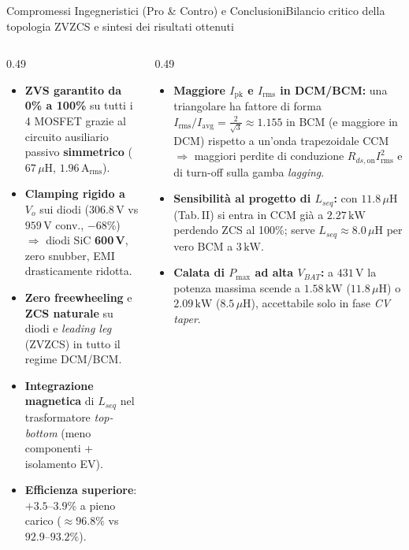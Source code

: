 \documentclass[aspectratio=169,9pt]{beamer}
\newcommand{\V}{\,\text{V}}
\newcommand{\A}{\,\text{A}}
\newcommand{\kW}{\,\text{kW}}
\newcommand{\uH}{\,\mu\text{H}}
\begin{document}
\begin{frame}{Compromessi Ingegneristici (Pro \& Contro) e Conclusioni}{Bilancio critico della topologia ZVZCS e sintesi dei risultati ottenuti}
  \begin{columns}[T,onlytextwidth]
    \begin{column}{0.49\textwidth}
      \begin{okbox}[title={Punti di Forza Dimostrati}]
        \begin{itemize}\setlength{\itemsep}{1.8pt}
          \item \textbf{ZVS garantito da 0\% a 100\%} su tutti i 4 MOSFET grazie al circuito ausiliario passivo \textbf{simmetrico} ($67\uH$, $1.96\A_{\text{rms}}$).
          \item \textbf{Clamping rigido a $V_o$} sui diodi ($306.8\V$ vs $959\V$ conv., $-68\%$) $\Rightarrow$ diodi SiC \textbf{600\,V}, zero snubber, EMI drasticamente ridotta.
          \item \textbf{Zero freewheeling} e \textbf{ZCS naturale} su diodi e \emph{leading leg} (ZVZCS) in tutto il regime DCM/BCM.
          \item \textbf{Integrazione magnetica} di $L_{seq}$ nel trasformatore \emph{top-bottom} (meno componenti + isolamento EV).
          \item \textbf{Efficienza superiore}: $\mathbf{+3.5\text{--}3.9\%}$ a pieno carico ($\approx 96.8\%$ vs $92.9\text{--}93.2\%$).
        \end{itemize}
      \end{okbox}
    \end{column}
    \begin{column}{0.49\textwidth}
      \begin{warnbox}[title={Compromessi e Limiti Progettuali}]
        \begin{itemize}\setlength{\itemsep}{1.8pt}
          \item \textbf{Maggiore $I_{\text{pk}}$ e $I_{\text{rms}}$ in DCM/BCM:} una triangolare ha fattore di forma $I_{\text{rms}}/I_{\text{avg}}=\frac{2}{\sqrt{3}}\approx 1.155$ in BCM (e maggiore in DCM) rispetto a un'onda trapezoidale CCM $\Rightarrow$ maggiori perdite di conduzione $R_{ds,\text{on}}I_{\text{rms}}^2$ e di turn-off sulla gamba \emph{lagging}.
          \item \textbf{Sensibilit\`a al progetto di $L_{seq}$:} con $11.8\uH$ (Tab.\,II) si entra in CCM gi\`a a $2.27\kW$ perdendo ZCS al 100\%; serve \textbf{$L_{seq}\approx 8.0\uH$} per vero BCM a $3\kW$.
          \item \textbf{Calata di $P_{\max}$ ad alta $V_{BAT}$:} a $431\V$ la potenza massima scende a $1.58\kW$ ($11.8\uH$) o $2.09\kW$ ($8.5\uH$), accettabile solo in fase \emph{CV taper}.
        \end{itemize}
      \end{warnbox}
    \end{column}
  \end{columns}


\end{frame}
\end{document}
